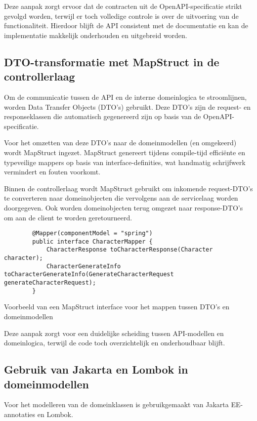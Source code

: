 Deze aanpak zorgt ervoor dat de contracten uit de OpenAPI-specificatie strikt gevolgd worden, terwijl er toch volledige controle is over de uitvoering van de functionaliteit. Hierdoor blijft de API consistent met de documentatie en kan de implementatie makkelijk onderhouden en uitgebreid worden.

\subsection{DTO-transformatie met MapStruct in de controllerlaag}

Om de communicatie tussen de API en de interne domeinlogica te stroomlijnen, worden Data Transfer Objects (DTO’s) gebruikt. Deze DTO’s zijn de request- en responseklassen die automatisch gegenereerd zijn op basis van de OpenAPI-specificatie.

Voor het omzetten van deze DTO’s naar de domeinmodellen (en omgekeerd) wordt MapStruct ingezet. MapStruct genereert tijdens compile-tijd efficiënte en typeveilige mappers op basis van interface-definities, wat handmatig schrijfwerk vermindert en fouten voorkomt.

Binnen de controllerlaag wordt MapStruct gebruikt om inkomende request-DTO’s te converteren naar domeinobjecten die vervolgens aan de servicelaag worden doorgegeven. Ook worden domeinobjecten terug omgezet naar response-DTO’s om aan de client te worden geretourneerd.

\begin{listing}
    \begin{verbatim}
        @Mapper(componentModel = "spring")
        public interface CharacterMapper {
            CharacterResponse toCharacterResponse(Character character);
            CharacterGenerateInfo toCharacterGenerateInfo(GenerateCharacterRequest generateCharacterRequest);
        }
    \end{verbatim}
    \caption[mapExample]{Voorbeeld van een MapStruct interface voor het mappen tussen DTO’s en domeinmodellen}
\end{listing}
Deze aanpak zorgt voor een duidelijke scheiding tussen API-modellen en domeinlogica, terwijl de code toch overzichtelijk en onderhoudbaar blijft.

\subsection{Gebruik van Jakarta en Lombok in domeinmodellen}

Voor het modelleren van de domeinklassen is gebruikgemaakt van Jakarta EE-annotaties en Lombok. 

